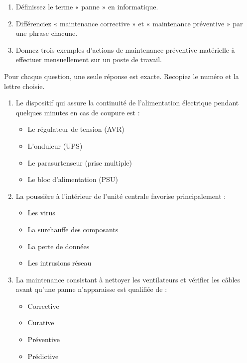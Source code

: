 \documentclass[11pt]{article}
\begin{document}
\begin{exercice}
\begin{enumerate}
    \item Définissez le terme « panne » en informatique.
    \item Différenciez « maintenance corrective » et « maintenance préventive » par une phrase chacune.
    \item Donnez trois exemples d'actions de maintenance préventive matérielle à effectuer mensuellement sur un poste de travail.
\end{enumerate}
\end{exercice}

\begin{exercice}
Pour chaque question, une seule réponse est exacte. Recopiez le numéro et la lettre choisie.
\begin{enumerate}
    \item Le dispositif qui assure la continuité de l'alimentation électrique pendant quelques minutes en cas de coupure est :
    \begin{itemize}
        \item[A.] Le régulateur de tension (AVR)
        \item[B.] L'onduleur (UPS)
        \item[C.] Le parasurtenseur (prise multiple)
        \item[D.] Le bloc d'alimentation (PSU)
    \end{itemize}
    \item La poussière à l'intérieur de l'unité centrale favorise principalement :
    \begin{itemize}
        \item[A.] Les virus
        \item[B.] La surchauffe des composants
        \item[C.] La perte de données
        \item[D.] Les intrusions réseau
    \end{itemize}
    \item La maintenance consistant à nettoyer les ventilateurs et vérifier les câbles avant qu'une panne n'apparaisse est qualifiée de :
    \begin{itemize}
        \item[A.] Corrective
        \item[B.] Curative
        \item[C.] Préventive
        \item[D.] Prédictive
    \end{itemize}
\end{enumerate}
\end{exercice}
\end{document}
